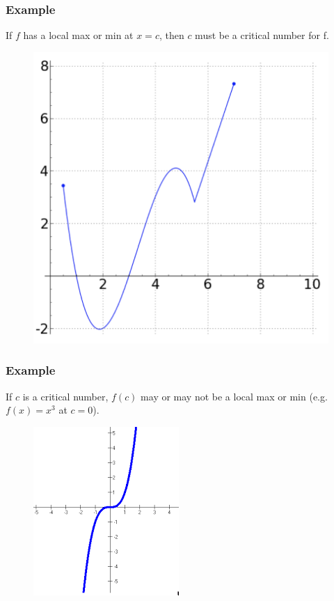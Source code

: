 \documentclass[t]{beamer}
\theoremstyle{plain}
\theoremstyle{definition}
\begin{document}
\begin{frame}

\frametitle{Example}

If $f$ has a local max or min at $x=c$, then $c$ must be a critical number for f. 

\begin{figure}[t]
\begin{center}
\includegraphics[scale=0.35]{fig/critical}
\end{center}
\end{figure}

\end{frame}

\begin{frame}

\frametitle{Example}

If $c$ is a critical number, $f(c)$ may or may not be a local max or min (e.g.  $f(x) = x^3$ at $c=0$).

\begin{figure}[t]
\begin{center}
\includegraphics[scale=0.60]{fig/critical2}
\end{center}
\end{figure}

\end{frame}
\end{document}
